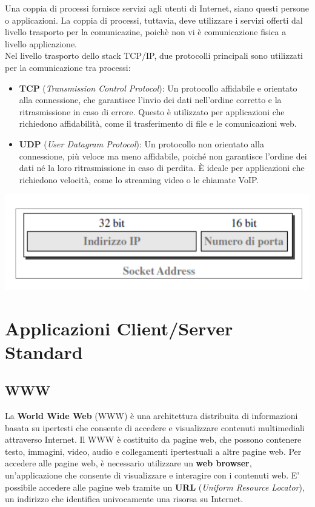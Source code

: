 \documentclass[12pt]{report}
\begin{document}
	Una coppia di processi fornisce servizi agli utenti di Internet, siano questi persone o applicazioni. La coppia di processi, tuttavia, deve utilizzare i servizi offerti dal livello trasporto per la comunicazine, poichè non vi è comunicazione fisica a livello applicazione.
	\vspace{\baselineskip}\\
	Nel livello trasporto dello stack TCP/IP, due protocolli principali sono utilizzati per la comunicazione tra processi:
	\begin{itemize}
		\item \textbf{TCP} (\textit{Transmission Control Protocol}): Un protocollo affidabile e orientato alla connessione, che garantisce l'invio dei dati nell'ordine corretto e la ritrasmissione in caso di errore. Questo è utilizzato per applicazioni che richiedono affidabilità, come il trasferimento di file e le comunicazioni web.
		\item \textbf{UDP} (\textit{User Datagram Protocol}): Un protocollo non orientato alla connessione, più veloce ma meno affidabile, poiché non garantisce l'ordine dei dati né la loro ritrasmissione in caso di perdita. È ideale per applicazioni che richiedono velocità, come lo streaming video o le chiamate VoIP.
	\end{itemize}
	\begin{center}
		\includegraphics[scale=0.5]{assets/socket-addr.png}
	\end{center}

	\section{Applicazioni Client/Server Standard}
	\subsection{WWW}
	La \textbf{World Wide Web} (WWW) è una architettura distribuita di informazioni basata su ipertesti che consente di accedere e visualizzare contenuti multimediali attraverso Internet. Il WWW è costituito da pagine web, che possono contenere testo, immagini, video, audio e collegamenti ipertestuali a altre pagine web. Per accedere alle pagine web, è necessario utilizzare un \textbf{web browser}, un'applicazione che consente di visualizzare e interagire con i contenuti web. E' possibile accedere alle pagine web tramite un \textbf{URL} (\textit{Uniform Resource Locator}), un indirizzo che identifica univocamente una risorsa su Internet.
\end{document}
